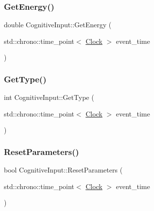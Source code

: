 \mbox{\label{classCognitiveInput_a9bdb43198c1a36b97a6da125331bc927}} 
\subsubsection{\texorpdfstring{Get\+Energy()}{GetEnergy()}}
{\footnotesize\ttfamily double Cognitive\+Input\+::\+Get\+Energy (\begin{DoxyParamCaption}\item[{std\+::chrono\+::time\+\_\+point$<$ \mbox{\hyperlink{universe_8h_a0ef8d951d1ca5ab3cfaf7ab4c7a6fd80}{Clock}} $>$}]{event\+\_\+time }\end{DoxyParamCaption})\hspace{0.3cm}{\ttfamily [inline]}}

\mbox{\label{classCognitiveInput_a0ad0919c7280b268493b27892bd7c784}} 
\subsubsection{\texorpdfstring{Get\+Type()}{GetType()}}
{\footnotesize\ttfamily int Cognitive\+Input\+::\+Get\+Type (\begin{DoxyParamCaption}\item[{std\+::chrono\+::time\+\_\+point$<$ \mbox{\hyperlink{universe_8h_a0ef8d951d1ca5ab3cfaf7ab4c7a6fd80}{Clock}} $>$}]{event\+\_\+time }\end{DoxyParamCaption})\hspace{0.3cm}{\ttfamily [inline]}}

\mbox{\label{classCognitiveInput_a943605b820cc279533e19d24e11405c6}} 
\subsubsection{\texorpdfstring{Reset\+Parameters()}{ResetParameters()}}
{\footnotesize\ttfamily bool Cognitive\+Input\+::\+Reset\+Parameters (\begin{DoxyParamCaption}\item[{std\+::chrono\+::time\+\_\+point$<$ \mbox{\hyperlink{universe_8h_a0ef8d951d1ca5ab3cfaf7ab4c7a6fd80}{Clock}} $>$}]{event\+\_\+time }\end{DoxyParamCaption})}

